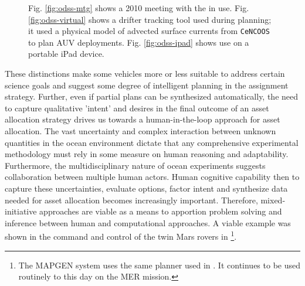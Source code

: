 \begin{figure}
\centering
{}
\caption{\small Fig. \ref{fig:odss-mtg} shows a 2010 \can meeting with
  the \od in use. Fig. \ref{fig:odss-virtual} shows a drifter tracking
  tool used during \can planning; it used a physical model of advected
  surface currents from \texttt{CeNCOOS} \cite{cencoos} to plan AUV
  deployments. Fig. \ref{fig:odss-ipad} shows \od use on a portable
  iPad device.}
\label{fig:odss2}
\end{figure}


These distinctions make some vehicles more or less suitable to address
certain science goals and suggest some degree of intelligent planning
in the assignment strategy. Further, even if partial plans can be
synthesized automatically, the need to capture qualitative 'intent'
and desires in the final outcome of an asset allocation strategy
drives us towards a human-in-the-loop approach for asset
allocation. The vast uncertainty and complex interaction between
unknown quantities in the ocean environment dictate that any
comprehensive experimental methodology must rely in some measure on
human reasoning and adaptability.  Furthermore, the multidisciplinary
nature of ocean experiments suggests collaboration between multiple
human actors. Human cognitive capability then to capture these
uncertainties, evaluate options, factor intent and synthesize data
needed for asset allocation becomes increasingly important. Therefore,
mixed-initiative approaches are viable as a means to apportion problem
solving and inference between human and computational approaches. A
viable example was shown in the command and control of the twin Mars
rovers in \cite{aichang04,bresina05,bresina05a}\footnote{The MAPGEN
  system uses the same \eu planner used in \rxe. It continues to be
  used routinely to this day on the MER mission.}.

